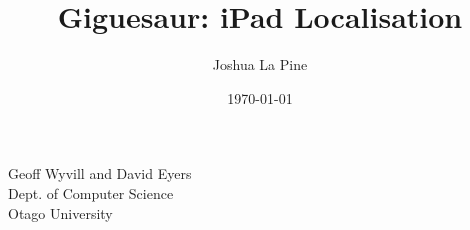 \documentclass{article}
\title{Giguesaur: iPad Localisation} %
\author{Joshua La Pine} %
\date{\today} %
\begin{document}
\maketitle %

\begin{center}
\large {Geoff Wyvill and David Eyers}\\
\vspace*{1\baselineskip}
Dept. of Computer Science \\
Otago University \\

\end{center}
\newpage

\tableofcontents
\newpage


\end{document}
